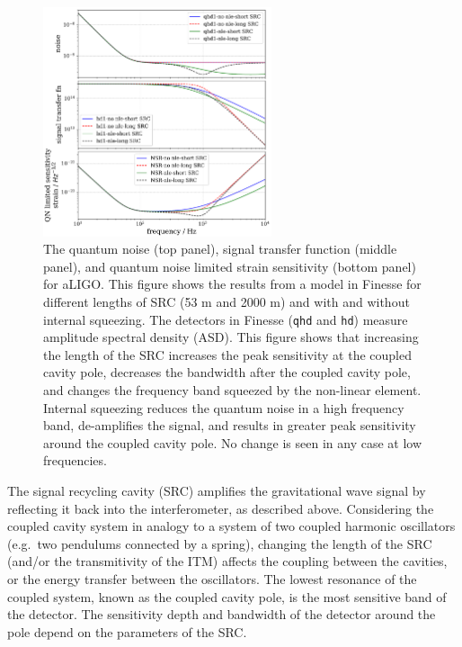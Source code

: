 \documentclass[aps,pra,superscriptaddress,reprint,nofootinbib]{revtex4-1}
\newcommand{\code}[1]{\texttt{#1}}
\begin{document}
\begin{figure}
	\begin{center}
	\includegraphics[width=0.6\textwidth]{figures/aLIGO_transfer_fns_and_sensitivity_comparison.pdf}
	\end{center}
	\caption{The quantum noise (top panel), signal transfer function (middle panel), and quantum noise limited strain sensitivity (bottom panel) for aLIGO. This figure shows the results from a model in Finesse for different lengths of SRC (53 m and 2000 m) and with and without internal squeezing. The detectors in Finesse (\code{qhd} and \code{hd}) measure amplitude spectral density (ASD). This figure shows that increasing the length of the SRC increases the peak sensitivity at the coupled cavity pole, decreases the bandwidth after the coupled cavity pole, and changes the frequency band squeezed by the non-linear element. Internal squeezing reduces the quantum noise in a high frequency band, de-amplifies the signal, and results in greater peak sensitivity around the coupled cavity pole. No change is seen in any case at low frequencies.}
	\label{fig:src_transfer_functions}
\end{figure}

The signal recycling cavity (SRC) amplifies the gravitational wave signal by reflecting it back into the interferometer, as described above.
Considering the coupled cavity system in analogy to a system of two coupled harmonic oscillators (e.g.\ two pendulums connected by a spring), changing the length of the SRC (and/or the transmitivity of the ITM) affects the coupling between the cavities, or the energy transfer between the oscillators. The lowest resonance of the coupled system, known as the coupled cavity pole, is the most sensitive band of the detector. The sensitivity depth and bandwidth of the detector around the pole depend on the parameters of the SRC.
\end{document}
